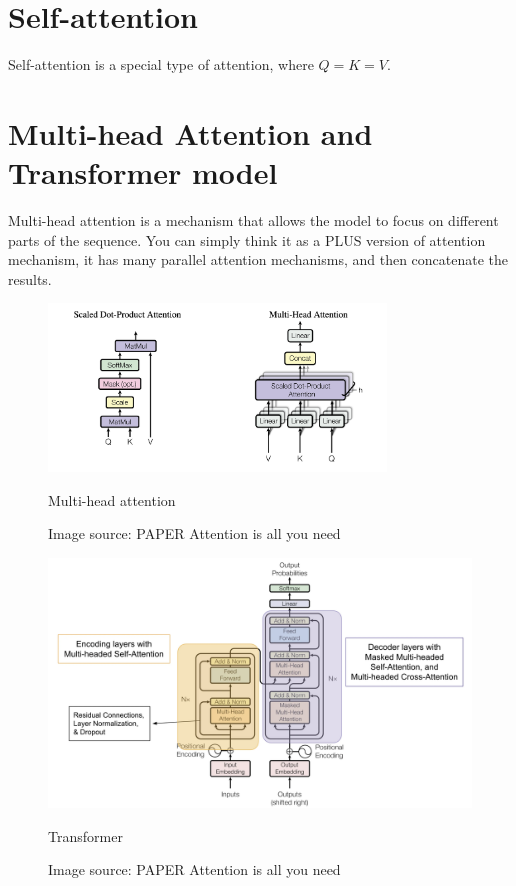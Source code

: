 \documentclass[oneside]{book}
\begin{document}
\section{Self-attention}
Self-attention is a special type of attention, where $Q = K = V$. 

\section{Multi-head Attention and Transformer model}
Multi-head attention is a mechanism that allows the model to focus on different parts of the sequence.
You can simply think it as a PLUS version of attention mechanism, it has many parallel attention mechanisms, and then concatenate the results.

\begin{figure}[H]
        \centering
        \includegraphics[width=0.8\textwidth]{images/multi-head attention.png}
        \caption{Multi-head attention}
        \caption*{Image source: PAPER Attention is all you need}
\end{figure}
\begin{figure}[H]
        \centering
        \includegraphics[width=1.0\textwidth]{images/transformer.png}
        \caption{Transformer}
        \caption*{Image source: PAPER Attention is all you need}
\end{figure}
\end{document}

